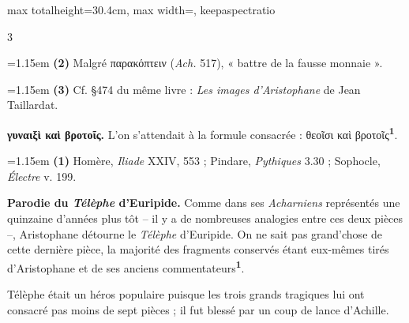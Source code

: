 \documentclass[11pt,twoside]{book}
\newcommand{\italique}[1]{\textit{#1}}
\newcommand{\marqueur}[1]{\textsuperscript{\color{rubricRed}\textbf{#1}}}
\begin{document}
\begin{adjustbox}{max totalheight=30.4cm, max width=\textwidth, keepaspectratio}
\begin{minipage}{\textwidth}
{\begin{multicols}{3}
\par\vspace{1.5pt}
\noindent\hangindent=1.15em {\color{sepiaNote}\textbf{(2)}} Malgré παρακόπτειν (\italique{Ach.} 517), « battre de la fausse monnaie ».
\par\vspace{1.5pt}
\noindent\hangindent=1.15em {\color{sepiaNote}\textbf{(3)}} Cf. §474 du même livre : \italique{Les images d'Aristophane} de Jean Taillardat.
\par\vspace{1.5pt}
 \textbf{γυναιξὶ καὶ βροτοῖς.} L'on s'attendait à la formule consacrée : θεοῖσι καὶ βροτοῖς\marqueur{1}.
\par\vspace{1.5pt}
\par\vspace{1.2pt}\par\nopagebreak\vspace{1pt}\noindent\hangindent=1.15em {\color{sepiaNote}\textbf{(1)}} Homère, \italique{Iliade} XXIV, 553 ; Pindare, \italique{Pythiques} 3.30 ; Sophocle, \italique{Électre} v. 199.
\par\vspace{1.5pt}
 \textbf{Parodie du \italique{Télèphe} d'Euripide.} Comme dans ses \italique{Acharniens} représentés une quinzaine d'années plus tôt -- il y a de nombreuses analogies entre ces deux pièces --, Aristophane détourne le \italique{Télèphe} d'Euripide. On ne sait pas grand'chose de cette dernière pièce, la majorité des fragments conservés étant eux-mêmes tirés d'Aristophane et de ses anciens commentateurs\marqueur{1}.
\par\vspace{1.5pt}
\noindent Télèphe était un héros populaire puisque les trois grands tragiques lui ont consacré pas moins de sept pièces ; il fut blessé par un coup de lance d'Achille.
\par\vspace{1.5pt}

\end{multicols}}
\end{minipage}
\end{adjustbox}
\end{document}
